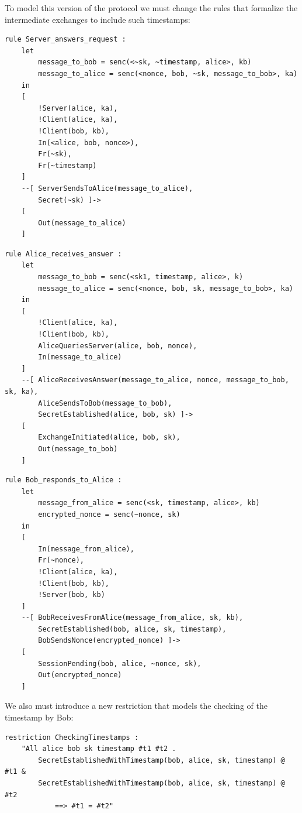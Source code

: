 \documentclass[fleqn,10pt]{SelfArx} %
\begin{document}
To model this version of the protocol we must change the rules that formalize the intermediate exchanges to include such timestamps:

\begin{lstlisting}[language=Tamarin]
rule Server_answers_request :
    let
        message_to_bob = senc(<~sk, ~timestamp, alice>, kb)
        message_to_alice = senc(<nonce, bob, ~sk, message_to_bob>, ka)
    in
    [
        !Server(alice, ka),
        !Client(alice, ka),
        !Client(bob, kb),
        In(<alice, bob, nonce>),
        Fr(~sk),
        Fr(~timestamp)
    ]
    --[ ServerSendsToAlice(message_to_alice),
        Secret(~sk) ]->
    [
        Out(message_to_alice)
    ]
\end{lstlisting}

\begin{lstlisting}[language=Tamarin]
rule Alice_receives_answer :
    let
        message_to_bob = senc(<sk1, timestamp, alice>, k)
        message_to_alice = senc(<nonce, bob, sk, message_to_bob>, ka)
    in
    [
        !Client(alice, ka),
        !Client(bob, kb),
        AliceQueriesServer(alice, bob, nonce),
        In(message_to_alice)
    ]
    --[ AliceReceivesAnswer(message_to_alice, nonce, message_to_bob, sk, ka),
        AliceSendsToBob(message_to_bob),
        SecretEstablished(alice, bob, sk) ]->
    [
        ExchangeInitiated(alice, bob, sk),
        Out(message_to_bob)
    ]
\end{lstlisting}

\begin{lstlisting}[language=Tamarin]
rule Bob_responds_to_Alice :
    let
        message_from_alice = senc(<sk, timestamp, alice>, kb)
        encrypted_nonce = senc(~nonce, sk)
    in
    [
        In(message_from_alice),
        Fr(~nonce),
        !Client(alice, ka),
        !Client(bob, kb),
        !Server(bob, kb)
    ]
    --[ BobReceivesFromAlice(message_from_alice, sk, kb),
        SecretEstablished(bob, alice, sk, timestamp),
        BobSendsNonce(encrypted_nonce) ]->
    [
        SessionPending(bob, alice, ~nonce, sk),
        Out(encrypted_nonce)
    ]
\end{lstlisting}

We also must introduce a new restriction that models the checking of the timestamp by Bob:

\begin{lstlisting}[language=Tamarin]
restriction CheckingTimestamps :
    "All alice bob sk timestamp #t1 #t2 .
        SecretEstablishedWithTimestamp(bob, alice, sk, timestamp) @ #t1 &
        SecretEstablishedWithTimestamp(bob, alice, sk, timestamp) @ #t2
            ==> #t1 = #t2"
\end{lstlisting}
\end{document}
